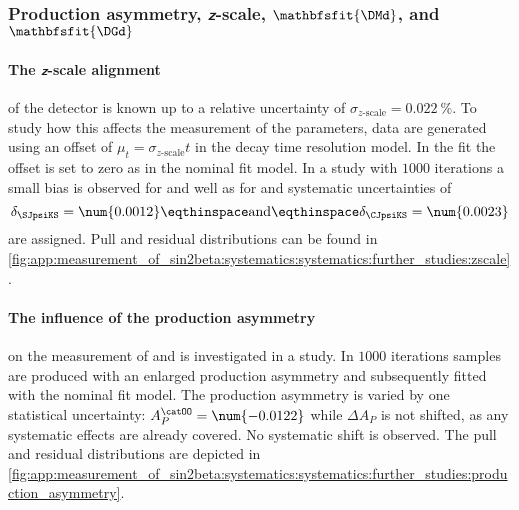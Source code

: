 \subsubsection[Production asymmetry, $z$-scale, \DMd, and \DGd]{Production asymmetry, $\mathbfsfit{z}$-scale, $\mathbfsfit{\DMd}$, and $\mathbfsfit{\DGd}$}
\label{sec:measurement_of_sin2beta:systematics:systematics:further_studies}

\paragraph{The $\mathbfsfit{z}$-scale alignment} of the \LHCb detector is known
up to a relative uncertainty of $\sigma_\text{$z$-scale} =
\SI{0.022}{\percent}$. To study how this affects the measurement of the \CP
parameters, data are generated using an offset of $\mu_{t} =
\sigma_\text{$z$-scale} t$ in the decay time resolution model. In the fit the
offset is set to zero as in the nominal fit model. In a \ToyMC study with
$\num{1000}$ iterations a small bias is observed for \SJpsiKS and well as for
\CJpsiKS and systematic uncertainties of
%
\begin{equation}
  \delta_{\SJpsiKS} = \num{0.0012}\eqthinspace\text{and}\eqthinspace\delta_{\CJpsiKS} = \num{0.0023}
\end{equation}
%
are assigned. Pull and residual distributions can be found in
\cref{fig:app:measurement_of_sin2beta:systematics:systematics:further_studies:zscale}.

\paragraph{The influence of the production asymmetry} on the measurement of
\SJpsiKS and \CJpsiKS is investigated in a \ToyMC study. In $\num{1000}$
iterations samples are produced with an enlarged production asymmetry and
subsequently fitted with the nominal fit model. The production asymmetry is
varied by one statistical uncertainty: $A_P^{\catOO} = \num{-0.0122}$ while
$\Delta A_P$ is not shifted, as any systematic effects are already covered. No
systematic shift is observed. The pull and residual distributions are depicted
in \cref{fig:app:measurement_of_sin2beta:systematics:systematics:further_studies:production_asymmetry}.

